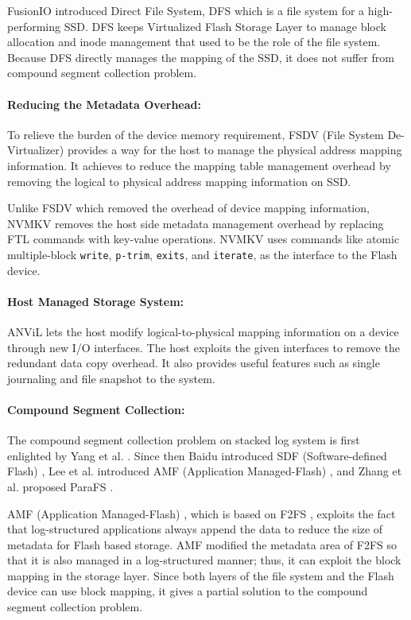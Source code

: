 \documentclass[prodmode,acmtecs]{acmsmall}
\begin{document}
FusionIO introduced Direct File System, DFS \cite{josephson2010dfs}
which is a file system for a high-performing SSD.  DFS keeps
Virtualized Flash Storage Layer to manage block allocation and inode
management that used to be the role of the file system. Because
DFS directly manages the mapping of the SSD, it does not suffer from
compound segment collection problem.

\paragraph{Reducing the Metadata Overhead:}

To relieve the burden of the device memory requirement, FSDV
(File System De-Virtualizer) \cite{zhangremoving} provides a way for
the host to manage the physical address mapping information. It
achieves to reduce the mapping table management overhead by removing
the logical to physical address mapping information on SSD.

Unlike FSDV which removed the overhead of device mapping information,
NVMKV \cite{nvmkv} removes the host side metadata management overhead
by replacing FTL commands with key-value operations. NVMKV uses
commands like atomic multiple-block \texttt{write}, \texttt{p-trim},
\texttt{exits}, and \texttt{iterate}, as the interface to the Flash
device.


\paragraph{Host Managed Storage System: }
ANViL \cite{anvil} lets the host modify logical-to-physical mapping
information on a device through new I/O interfaces. The host exploits
the given interfaces to remove the redundant data copy overhead. It
also provides useful features such as single journaling and file
snapshot to the system.

\paragraph{Compound Segment Collection:}
The compound segment collection problem on stacked log system is first
enlighted by Yang et al. \cite{yang2014don}. Since then Baidu
introduced SDF (Software-defined Flash) \cite{sdf}, Lee et
al. introduced AMF (Application Managed-Flash)
\cite{lee2016application}, and Zhang et al. proposed
ParaFS \cite{zhang2016parafs}.


AMF (Application Managed-Flash) \cite{lee2016application}, which is
based on F2FS \cite{lee2015f2fs}, exploits the fact that
log-structured applications always append the data to reduce the size
of metadata for Flash based storage. AMF modified the metadata area
of F2FS so that it is also managed in a log-structured manner; thus, it can
exploit the block mapping in the storage layer. Since both layers of
the file system and the Flash device can use block mapping, it gives a
partial solution to the compound segment collection problem.
\end{document}
